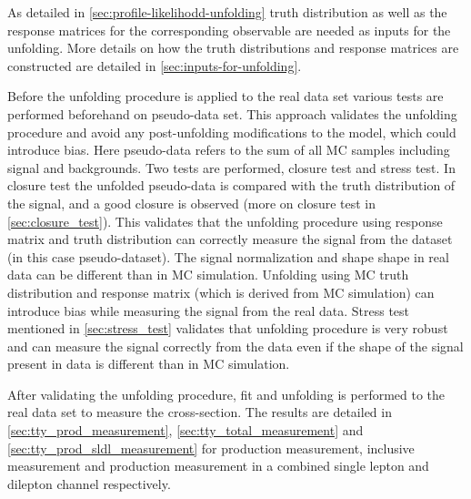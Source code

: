 As detailed in \cref{sec:profile-likelihodd-unfolding} truth distribution as well as the response matrices for the corresponding observable are needed as inputs for the unfolding. More details on how the truth distributions and response matrices are constructed are detailed in \cref{sec:inputs-for-unfolding}.

Before the unfolding procedure is applied to the real data set various tests are performed beforehand on pseudo-data set. This approach validates the unfolding procedure and avoid any post-unfolding modifications to the model, which could introduce bias. Here pseudo-data refers to the sum of all MC samples including signal and backgrounds. Two tests are performed, closure test and stress test. In closure test the unfolded pseudo-data is compared with the truth distribution of the signal, and a good closure is observed (more on closure test in \cref{sec:closure_test}). This validates that the unfolding procedure using response matrix and truth distribution can correctly measure the signal from the dataset (in this case pseudo-dataset). The signal normalization and shape shape in real data can be different than in MC simulation. Unfolding using MC truth distribution and response matrix (which is derived from MC simulation) can introduce bias while measuring the signal from the real data. Stress test mentioned in \cref{sec:stress_test} validates that unfolding procedure is very robust and can measure the signal correctly from the data even if the shape of the signal present in data is different than in MC simulation. 

After validating the unfolding procedure, fit and unfolding is performed to the real data set to measure the cross-section. The results are detailed in \cref{sec:tty_prod_measurement}, \cref{sec:tty_total_measurement} and \cref{sec:tty_prod_sldl_measurement} for \tty production measurement, inclusive \tty measurement and \tty production measurement in a combined single lepton and dilepton channel respectively.




